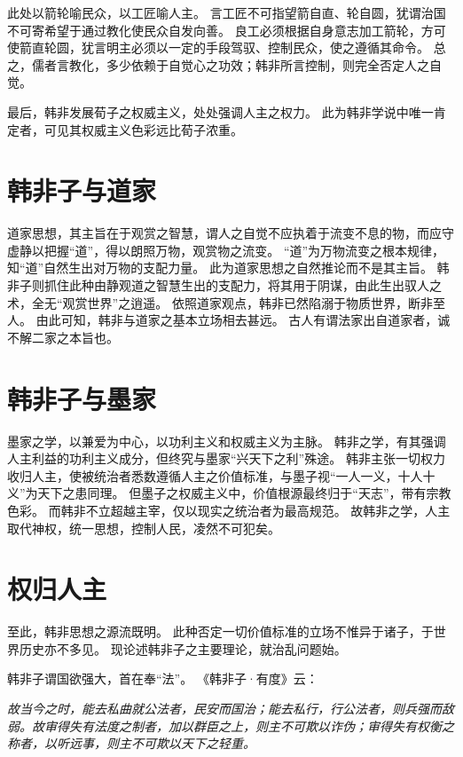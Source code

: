 \documentclass[11pt]{article}
\begin{document}
此处以箭轮喻民众，以工匠喻人主。
言工匠不可指望箭自直、轮自圆，犹谓治国不可寄希望于通过教化使民众自发向善。
良工必须根据自身意志加工箭轮，方可使箭直轮圆，犹言明主必须以一定的手段驾驭、控制民众，使之遵循其命令。
总之，儒者言教化，多少依赖于自觉心之功效；韩非所言控制，则完全否定人之自觉。

\par

最后，韩非发展荀子之权威主义，处处强调人主之权力。
此为韩非学说中唯一肯定者，可见其权威主义色彩远比荀子浓重。
  
\section{韩非子与道家}
道家思想，其主旨在于观赏之智慧，谓人之自觉不应执着于流变不息的物，而应守虚静以把握“道”，得以朗照万物，观赏物之流变。
“道”为万物流变之根本规律，知“道”自然生出对万物的支配力量。
此为道家思想之自然推论而不是其主旨。
韩非子则抓住此种由静观道之智慧生出的支配力，将其用于阴谋，由此生出驭人之术，全无“观赏世界”之逍遥。
依照道家观点，韩非已然陷溺于物质世界，断非至人。
由此可知，韩非与道家之基本立场相去甚远。
古人有谓法家出自道家者，诚不解二家之本旨也。
  
\section{韩非子与墨家}
墨家之学，以兼爱为中心，以功利主义和权威主义为主脉。
韩非之学，有其强调人主利益的功利主义成分，但终究与墨家“兴天下之利”殊途。
韩非主张一切权力收归人主，使被统治者悉数遵循人主之价值标准，与墨子视“一人一义，十人十义”为天下之患同理。
但墨子之权威主义中，价值根源最终归于“天志”，带有宗教色彩。
而韩非不立超越主宰，仅以现实之统治者为最高规范。
故韩非之学，人主取代神权，统一思想，控制人民，凌然不可犯矣。
  
\section{权归人主}
至此，韩非思想之源流既明。
此种否定一切价值标准的立场不惟异于诸子，于世界历史亦不多见。
现论述韩非子之主要理论，就治乱问题始。

\par

韩非子谓国欲强大，首在奉“法”。
《韩非子·有度》云：

\textit{故当今之时，能去私曲就公法者，民安而国治；能去私行，行公法者，则兵强而敌弱。故审得失有法度之制者，加以群臣之上，则主不可欺以诈伪；审得失有权衡之称者，以听远事，则主不可欺以天下之轻重。}
\end{document}
